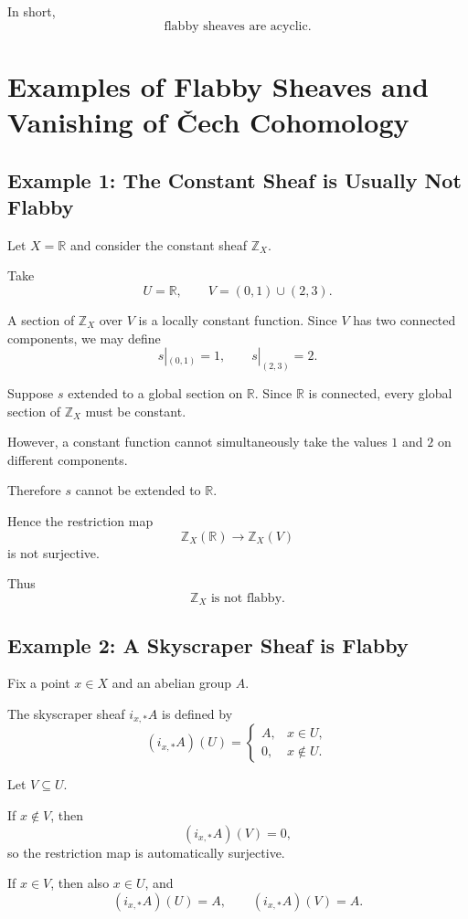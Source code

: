\documentclass[12pt,a4paper]{article}
\theoremstyle{notespace}
\begin{document}
In short,
\[
\boxed{
	\text{flabby sheaves are acyclic.}
}
\]

\section{Examples of Flabby Sheaves and Vanishing of \v{C}ech Cohomology}

\subsection{Example 1: The Constant Sheaf is Usually Not Flabby}

Let $X=\mathbb R$ and consider the constant sheaf $\mathbb Z_X$.

Take
\[
U=\mathbb R,
\qquad
V=(0,1)\cup(2,3).
\]

A section of $\mathbb Z_X$ over $V$ is a locally constant function.
Since $V$ has two connected components, we may define
\[
s|_{(0,1)}=1,
\qquad
s|_{(2,3)}=2.
\]

Suppose $s$ extended to a global section on $\mathbb R$.
Since $\mathbb R$ is connected, every global section of $\mathbb Z_X$
must be constant.

However, a constant function cannot simultaneously take the values
$1$ and $2$ on different components.

Therefore $s$ cannot be extended to $\mathbb R$.

Hence the restriction map
\[
\mathbb Z_X(\mathbb R)
\longrightarrow
\mathbb Z_X(V)
\]
is not surjective.

Thus
\[
\boxed{\mathbb Z_X \text{ is not flabby.}}
\]

\subsection{Example 2: A Skyscraper Sheaf is Flabby}

Fix a point $x\in X$ and an abelian group $A$.

The skyscraper sheaf $i_{x,*}A$ is defined by
\[
(i_{x,*}A)(U)=
\begin{cases}
	A, & x\in U,\\
	0, & x\notin U.
\end{cases}
\]

Let $V\subseteq U$.

If $x\notin V$, then
\[
(i_{x,*}A)(V)=0,
\]
so the restriction map is automatically surjective.

If $x\in V$, then also $x\in U$, and
\[
(i_{x,*}A)(U)=A,
\qquad
(i_{x,*}A)(V)=A.
\]
\end{document}
